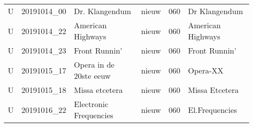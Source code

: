 \documentclass[]{article}
\begin{document}
\begin{longtable}[l]{llllll}
\addlinespace
U & 20191014\_00 & Dr. Klangendum & nieuw & 060 & Dr Klangendum\\
U & 20191014\_22 & American Highways & nieuw & 060 & American Highways\\
U & 20191014\_23 & Front Runnin’ & nieuw & 060 & Front Runnin'\\
U & 20191015\_17 & Opera in de 20ste eeuw & nieuw & 060 & Opera-XX\\
U & 20191015\_18 & Missa etcetera & nieuw & 060 & Missa Etcetera\\
U & 20191016\_22 & Electronic Frequencies & nieuw & 060 & El.Frequencies\\*
\end{longtable}

\endgroup{}
\end{document}
